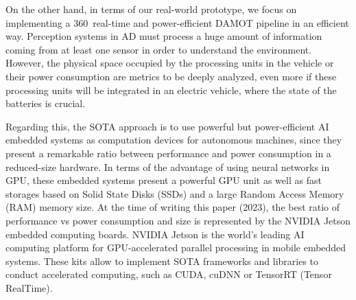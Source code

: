 
On the other hand, in terms of our real-world prototype, we focus on implementing a 360\degree~real-time and power-efficient \ac{DAMOT} pipeline in an efficient way. Perception systems in \ac{AD} must process a huge amount of information coming from at least one sensor in order to understand the environment. However, the physical space occupied by the processing units in the vehicle or their power consumption are metrics to be deeply analyzed, even more if these processing units will be integrated in an electric vehicle, where the state of the batteries is crucial. 

Regarding this, the \ac{SOTA} approach is to use powerful but power-efficient \ac{AI} embedded systems as computation devices for autonomous machines, since they present a remarkable ratio between performance and power consumption in a reduced-size hardware. In terms of the advantage of using neural networks in \ac{GPU}, these embedded systems present a powerful \ac{GPU} unit as well as fast storages based on Solid State Disks (SSDs) and a large Random Access Memory (RAM) memory size. At the time of writing this paper (2023), the best ratio of performance vs power consumption and size is represented by the NVIDIA Jetson embedded computing boards. NVIDIA Jetson is the world's leading \ac{AI} computing platform for \ac{GPU}-accelerated parallel processing in mobile embedded systems. These kits allow to implement \ac{SOTA} frameworks and libraries to conduct accelerated computing, such as \ac{CUDA}, cuDNN or TensorRT (Tensor RealTime). 

